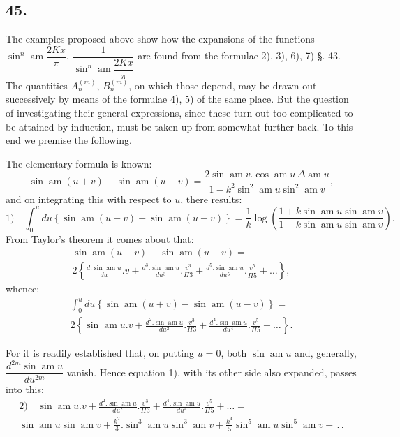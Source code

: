 \documentclass{article}
\begin{document}
\subsection*{45.}
The examples proposed above show how the expansions of the functions $\sin^{n}\operatorname{am}\dfrac{2Kx}{\pi}$, $\dfrac{1}{\sin^{n}\operatorname{am}\dfrac{2Kx}{\pi}}$ are found from the formulae 2), 3), 6), 7) §. 43. The quantities $A_{n}^{(m)}$, $B_{n}^{(m)}$, on which those depend, may be drawn out successively by means of the formulae 4), 5) of the same place. But the question of investigating their general expressions, since these turn out too complicated to be attained by induction, must be taken up from somewhat further back. To this end we premise the following.

The elementary formula is known:
\[
\sin\operatorname{am}(u+v)-\sin\operatorname{am}(u-v)=\frac{2\sin\operatorname{am}v.\cos\operatorname{am}u\,\Delta\operatorname{am}u}{1-k^{2}\sin^{2}\operatorname{am}u\sin^{2}\operatorname{am}v},
\]
and on integrating this with respect to $u$, there results:
\[
\text{1)}\quad\int_{0}^{u}du\left\{\sin\operatorname{am}(u+v)-\sin\operatorname{am}(u-v)\right\}=\frac{1}{k}\log\left(\frac{1+k\sin\operatorname{am}u\sin\operatorname{am}v}{1-k\sin\operatorname{am}u\sin\operatorname{am}v}\right).
\]
From Taylor's theorem it comes about that:
\[
\begin{gathered}
\sin\operatorname{am}(u+v)-\sin\operatorname{am}(u-v)=\\[1.5ex]
2\left\{\frac{d.\sin\operatorname{am}u}{du}.v+\frac{d^{3}.\sin\operatorname{am}u}{du^{3}}.\frac{v^{3}}{\Pi 3}+\frac{d^{5}.\sin\operatorname{am}u}{du^{5}}.\frac{v^{5}}{\Pi 5}+\ldots\right\},
\end{gathered}
\]
whence:
\[
\begin{gathered}
\int_{0}^{u}du\left\{\sin\operatorname{am}(u+v)-\sin\operatorname{am}(u-v)\right\}=\\[1.5ex]
2\left\{\sin\operatorname{am}u.v+\frac{d^{2}.\sin\operatorname{am}u}{du^{2}}.\frac{v^{3}}{\Pi 3}+\frac{d^{4}.\sin\operatorname{am}u}{du^{4}}.\frac{v^{5}}{\Pi 5}+\ldots\right\}.
\end{gathered}
\]

For it is readily established that, on putting $u=0$, both $\sin\operatorname{am}u$ and, generally, $\dfrac{d^{2m}\sin\operatorname{am}u}{du^{2m}}$ vanish. Hence equation 1), with its other side also expanded, passes into this:
\[
\begin{gathered}
\text{2)}\quad\sin\operatorname{am}u.v+\frac{d^{2}.\sin\operatorname{am}u}{du^{2}}.\frac{v^{3}}{\Pi 3}+\frac{d^{4}.\sin\operatorname{am}u}{du^{4}}.\frac{v^{5}}{\Pi 5}+\ldots=\\[1.5ex]
\sin\operatorname{am}u\sin\operatorname{am}v+\frac{k^{2}}{3}.\sin^{3}\operatorname{am}u\sin^{3}\operatorname{am}v+\frac{k^{4}}{5}\sin^{5}\operatorname{am}u\sin^{5}\operatorname{am}v+\,.\,.
\end{gathered}
\]
\end{document}

